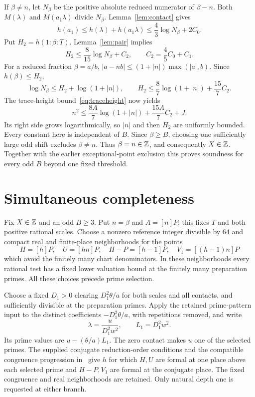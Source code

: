 \documentclass[11pt,a4paper]{article}
\begin{document}
If $\beta\ne n$, let $N_\beta$ be the positive absolute reduced
numerator of $\beta-n$. Both $M(\lambda)$ and $M(a_1\lambda)$ divide
$N_\beta$. Lemma~\ref{lem:contact} gives
\[
 h(a_1)\le h(\lambda)+h(a_1\lambda)
               \le\frac43\log N_\beta+2C_0.
\]
Put $H_2=h(1:\beta:T)$. Lemma~\ref{lem:pair} implies
\[
 H_2\le\frac8{15}\log N_\beta+C_2,\qquad C_2=\frac45C_0+C_1.
\]
For a reduced fraction $\beta=a/b$,
$|a-nb|\le(1+|n|)\max(|a|,b)$. Since $h(\beta)\le H_2$,
\[
 \log N_\beta\le H_2+\log(1+|n|),\qquad
 H_2\le\frac87\log(1+|n|)+\frac{15}{7}C_2.
\]
The trace-height bound~\eqref{eq:traceheight} now yields
\[
 n^2\le\frac{8A}{7}\log(1+|n|)+\frac{15A}{7}C_2+J.
\]
Its right side grows logarithmically, so $|n|$ and then $H_2$ are
uniformly bounded. Every constant here is independent of $B$.
Since $\beta\ge B$, choosing one sufficiently large odd shift excludes
$\beta\ne n$. Thus $\beta=n\in\mathbb Z$, and consequently $X\in\mathbb Z$.
Together with the earlier exceptional-point exclusion this proves
soundness for every odd $B$ beyond one fixed threshold.

\section{Simultaneous completeness}

Fix $X\in\mathbb Z$ and an odd $B\ge3$. Put $n=\beta$ and $A=[n]P$;
this fixes $T$ and both positive rational scales. Choose a nonzero
reference integer divisible by $64$ and compact real and finite-place
neighborhoods for the points
\[
 H=[h]P,\quad U=[hn]P,\quad H-P=[h-1]P,\quad
 V_1=[(h-1)n]P
\]
which avoid the finitely many chart denominators. In these neighborhoods
every rational test has a fixed lower valuation bound at the finitely
many preparation primes. All these choices precede prime selection.

Choose a fixed $D_1>0$ clearing $D_1^2\theta/a$ for both scales and
all contacts, and sufficiently divisible at the preparation primes.
Apply the retained prime-pattern input to the distinct coefficients
$-D_1^2\theta/a$, with repetitions removed, and write
\[
                \lambda=\frac{u}{D_1^2w^2},\qquad L_1=D_1^2w^2.
\]
Its prime values are $u-(\theta/a)L_1$. The zero contact makes $u$
one of the selected primes. The supplied conjugate reduction-order
conditions and the compatible congruence progression in~\cite{Dependencies}
give $h$ for which $H,U$ are formal at one place above each selected
prime and $H-P,V_1$ are formal at the conjugate place. The fixed
congruence and real neighborhoods are retained. Only natural depth one
is requested at either branch.
\end{document}
